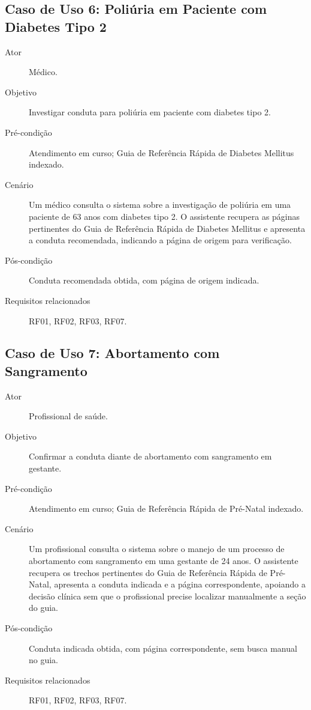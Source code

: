 \documentclass[conference,a4paper]{IEEEtran}
\begin{document}
\subsection{Caso de Uso 6: Poliúria em Paciente com Diabetes Tipo 2}

\begin{description}
  \item[Ator] Médico.
  \item[Objetivo] Investigar conduta para poliúria em paciente com diabetes tipo 2.
  \item[Pré-condição] Atendimento em curso; Guia de Referência Rápida de Diabetes Mellitus indexado.
  \item[Cenário] Um médico consulta o sistema sobre a investigação de poliúria em uma paciente de 63 anos com diabetes tipo 2. O assistente recupera as páginas pertinentes do Guia de Referência Rápida de Diabetes Mellitus e apresenta a conduta recomendada, indicando a página de origem para verificação.
  \item[Pós-condição] Conduta recomendada obtida, com página de origem indicada.
  \item[Requisitos relacionados] RF01, RF02, RF03, RF07.
\end{description}

\subsection{Caso de Uso 7: Abortamento com Sangramento}

\begin{description}
  \item[Ator] Profissional de saúde.
  \item[Objetivo] Confirmar a conduta diante de abortamento com sangramento em gestante.
  \item[Pré-condição] Atendimento em curso; Guia de Referência Rápida de Pré-Natal indexado.
  \item[Cenário] Um profissional consulta o sistema sobre o manejo de um processo de abortamento com sangramento em uma gestante de 24 anos. O assistente recupera os trechos pertinentes do Guia de Referência Rápida de Pré-Natal, apresenta a conduta indicada e a página correspondente, apoiando a decisão clínica sem que o profissional precise localizar manualmente a seção do guia.
  \item[Pós-condição] Conduta indicada obtida, com página correspondente, sem busca manual no guia.
  \item[Requisitos relacionados] RF01, RF02, RF03, RF07.
\end{description}
\end{document}
